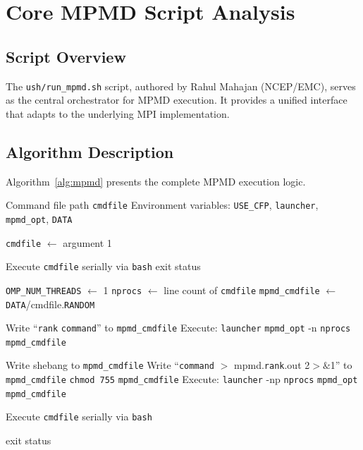 \documentclass[11pt,a4paper,twoside]{article}
\begin{document}
\section{Core MPMD Script Analysis}
\label{sec:run_mpmd}

\subsection{Script Overview}

The \texttt{ush/run\_mpmd.sh} script, authored by Rahul Mahajan (NCEP/EMC), serves as the central orchestrator for MPMD execution. It provides a unified interface that adapts to the underlying MPI implementation.

\subsection{Algorithm Description}

Algorithm~\ref{alg:mpmd} presents the complete MPMD execution logic.

\begin{algorithm}[H]
\caption{MPMD Execution Flow}
\label{alg:mpmd}
\begin{algorithmic}[1]
\REQUIRE Command file path \texttt{cmdfile}
\REQUIRE Environment variables: \texttt{USE\_CFP}, \texttt{launcher}, \texttt{mpmd\_opt}, \texttt{DATA}

\STATE \texttt{cmdfile} $\leftarrow$ argument 1

    \STATE Execute \texttt{cmdfile} serially via \texttt{bash}
    \RETURN exit status
\ENDIF

\STATE \texttt{OMP\_NUM\_THREADS} $\leftarrow$ 1 
\STATE \texttt{nprocs} $\leftarrow$ line count of \texttt{cmdfile}
\STATE \texttt{mpmd\_cmdfile} $\leftarrow$ \texttt{DATA}/cmdfile.\texttt{RANDOM}

    \STATE {}
        \STATE Write ``\texttt{rank} \texttt{command}'' to \texttt{mpmd\_cmdfile}
    \ENDFOR
    \STATE Execute: \texttt{launcher} \texttt{mpmd\_opt} -n \texttt{nprocs} \texttt{mpmd\_cmdfile}
    
    \STATE {}
    \STATE Write shebang to \texttt{mpmd\_cmdfile}
        \STATE Write ``\texttt{command} $>$ mpmd.\texttt{rank}.out 2$>\&$1'' to \texttt{mpmd\_cmdfile}
    \ENDFOR
    \STATE \texttt{chmod 755} \texttt{mpmd\_cmdfile}
    \STATE Execute: \texttt{launcher} -np \texttt{nprocs} \texttt{mpmd\_opt} \texttt{mpmd\_cmdfile}
    
\ELSE
    \STATE Execute \texttt{cmdfile} serially via \texttt{bash}
\ENDIF

\RETURN exit status
\end{algorithmic}
\end{algorithm}
\end{document}
